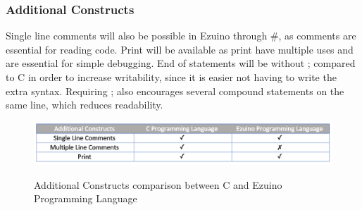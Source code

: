\subsubsection*{Additional Constructs}
Single line comments will also be possible in Ezuino through \#, as comments are essential for reading code. Print will be available as print have multiple uses and are essential for simple debugging. End of statements will be without ; compared to C in order to increase writability, since it is easier not having to write the extra syntax. Requiring ; also encourages several compound statements on the same line, which reduces readability. 
\begin{figure}[H]
\centering
\caption{Additional Constructs comparison between C and Ezuino Programming Language}
\includegraphics[scale=0.60]{figures/language_features/langf09.png}
\label{lf09}
\end{figure}
